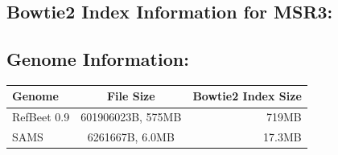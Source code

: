 \documentclass{article}
\begin{document}
\subsection{Bowtie2 Index Information for MSR3:}

\subsection{Genome Information:}

	\begin{tabular}{| l | c | r |}
	\hline
	Genome & File Size & Bowtie2 Index Size \\ \hline
	RefBeet 0.9 & 601906023B, 575MB & 719MB \\ \hline
	SAMS & 6261667B, 6.0MB & 17.3MB \\ \hline
	\end{tabular}





\end{document}
